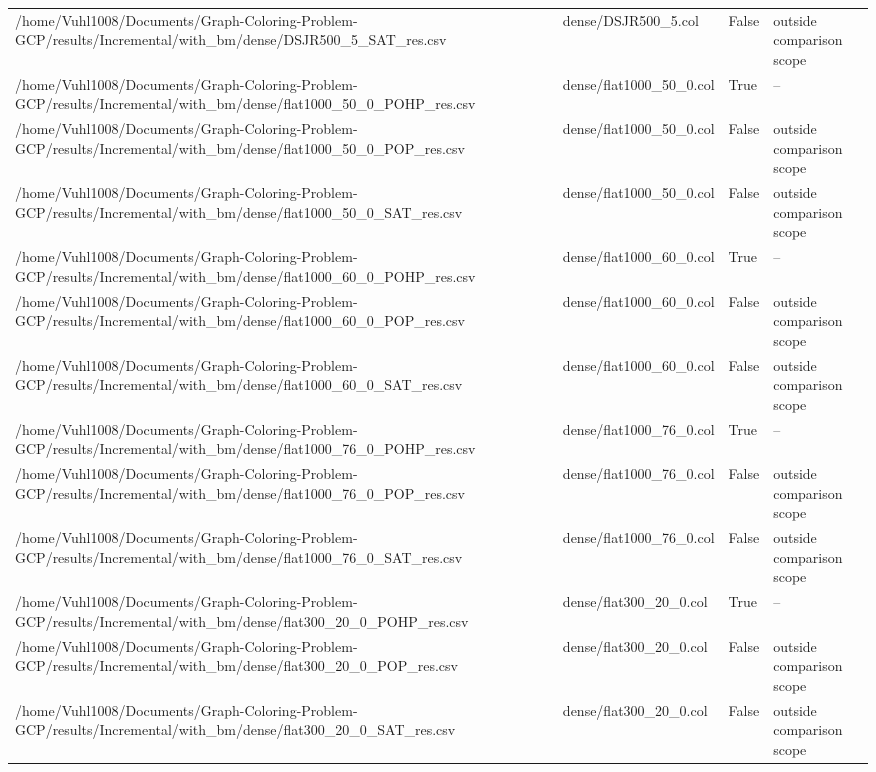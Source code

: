 \begin{table}[htbp]
\begin{tabular}{llll}
/home/Vuhl1008/Documents/Graph-Coloring-Problem-GCP/results/Incremental/with\_bm/dense/DSJR500\_5\_SAT\_res.csv & dense/DSJR500\_5.col & False & outside comparison scope \\
/home/Vuhl1008/Documents/Graph-Coloring-Problem-GCP/results/Incremental/with\_bm/dense/flat1000\_50\_0\_POHP\_res.csv & dense/flat1000\_50\_0.col & True & -- \\
/home/Vuhl1008/Documents/Graph-Coloring-Problem-GCP/results/Incremental/with\_bm/dense/flat1000\_50\_0\_POP\_res.csv & dense/flat1000\_50\_0.col & False & outside comparison scope \\
/home/Vuhl1008/Documents/Graph-Coloring-Problem-GCP/results/Incremental/with\_bm/dense/flat1000\_50\_0\_SAT\_res.csv & dense/flat1000\_50\_0.col & False & outside comparison scope \\
/home/Vuhl1008/Documents/Graph-Coloring-Problem-GCP/results/Incremental/with\_bm/dense/flat1000\_60\_0\_POHP\_res.csv & dense/flat1000\_60\_0.col & True & -- \\
/home/Vuhl1008/Documents/Graph-Coloring-Problem-GCP/results/Incremental/with\_bm/dense/flat1000\_60\_0\_POP\_res.csv & dense/flat1000\_60\_0.col & False & outside comparison scope \\
/home/Vuhl1008/Documents/Graph-Coloring-Problem-GCP/results/Incremental/with\_bm/dense/flat1000\_60\_0\_SAT\_res.csv & dense/flat1000\_60\_0.col & False & outside comparison scope \\
/home/Vuhl1008/Documents/Graph-Coloring-Problem-GCP/results/Incremental/with\_bm/dense/flat1000\_76\_0\_POHP\_res.csv & dense/flat1000\_76\_0.col & True & -- \\
/home/Vuhl1008/Documents/Graph-Coloring-Problem-GCP/results/Incremental/with\_bm/dense/flat1000\_76\_0\_POP\_res.csv & dense/flat1000\_76\_0.col & False & outside comparison scope \\
/home/Vuhl1008/Documents/Graph-Coloring-Problem-GCP/results/Incremental/with\_bm/dense/flat1000\_76\_0\_SAT\_res.csv & dense/flat1000\_76\_0.col & False & outside comparison scope \\
/home/Vuhl1008/Documents/Graph-Coloring-Problem-GCP/results/Incremental/with\_bm/dense/flat300\_20\_0\_POHP\_res.csv & dense/flat300\_20\_0.col & True & -- \\
/home/Vuhl1008/Documents/Graph-Coloring-Problem-GCP/results/Incremental/with\_bm/dense/flat300\_20\_0\_POP\_res.csv & dense/flat300\_20\_0.col & False & outside comparison scope \\
/home/Vuhl1008/Documents/Graph-Coloring-Problem-GCP/results/Incremental/with\_bm/dense/flat300\_20\_0\_SAT\_res.csv & dense/flat300\_20\_0.col & False & outside comparison scope \\

\end{tabular}
\end{table}
